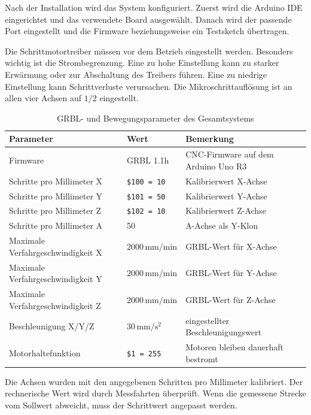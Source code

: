 Nach der Installation wird das System konfiguriert. Zuerst wird die Arduino IDE eingerichtet und das verwendete Board ausgewählt. Danach wird der passende Port eingestellt und die Firmware beziehungsweise ein Testsketch übertragen.

Die Schrittmotortreiber müssen vor dem Betrieb eingestellt werden. Besonders wichtig ist die Strombegrenzung. Eine zu hohe Einstellung kann zu starker Erwärmung oder zur Abschaltung des Treibers führen. Eine zu niedrige Einstellung kann Schrittverluste verursachen. Die Mikroschrittauflösung ist an allen vier Achsen auf \(1/2\) eingestellt.

\begin{table}[H]
	\centering
	\caption{GRBL- und Bewegungsparameter des Gesamtsystems}
	\label{tab:grbl_bewegungsparameter_gesamtsystem}
	\begin{tabular}{p{5cm} p{4cm} p{6cm}}
		\hline
		\textbf{Parameter} & \textbf{Wert} & \textbf{Bemerkung} \\
		\hline
		Firmware & GRBL 1.1h & CNC-Firmware auf dem Arduino Uno R3 \\
		Schritte pro Millimeter X & \texttt{\$100 = 10} & Kalibrierwert X-Achse \\
		Schritte pro Millimeter Y & \texttt{\$101 = 50} & Kalibrierwert Y-Achse \\
		Schritte pro Millimeter Z & \texttt{\$102 = 10} & Kalibrierwert Z-Achse \\
		Schritte pro Millimeter A & 50 & A-Achse als Y-Klon \\
		Maximale Verfahrgeschwindigkeit X & \(2000\,\mathrm{mm/min}\) & GRBL-Wert für X-Achse \\
		Maximale Verfahrgeschwindigkeit Y & \(2000\,\mathrm{mm/min}\) & GRBL-Wert für Y-Achse \\
		Maximale Verfahrgeschwindigkeit Z & \(2000\,\mathrm{mm/min}\) & GRBL-Wert für Z-Achse \\
		Beschleunigung X/Y/Z & \(30\,\mathrm{mm/s^2}\) & eingestellter Beschleunigungswert \\
		Motorhaltefunktion & \texttt{\$1 = 255} & Motoren bleiben dauerhaft bestromt \\
		
		\hline
	\end{tabular}
\end{table}

Die Achsen wurden mit den angegebenen Schritten pro Millimeter kalibriert. Der rechnerische Wert wird durch Messfahrten überprüft. Wenn die gemessene Strecke vom Sollwert abweicht, muss der Schrittwert angepasst werden.

